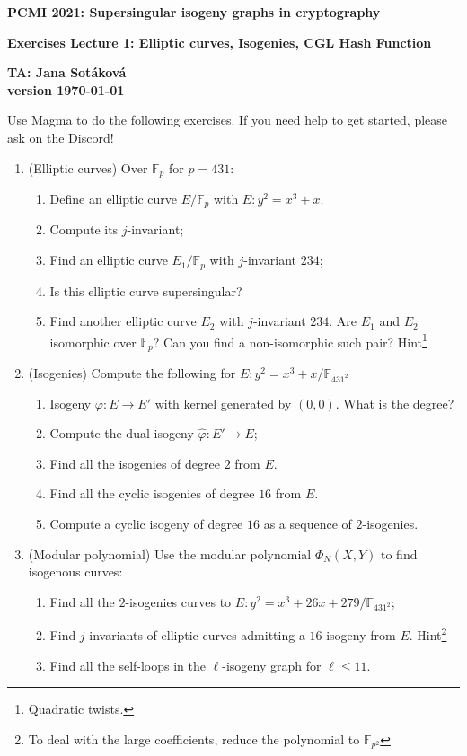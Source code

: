 \documentclass[12pt]{report}
\newcommand{\F}{\mathbb{F}}
\begin{document}
\thispagestyle{empty}

\sloppy
\centerline{\Large\bf PCMI 2021: Supersingular isogeny graphs in cryptography } 

\vspace{4mm}
\centerline{\Large\bf Exercises Lecture 1: Elliptic curves, Isogenies, CGL Hash Function} 
\vspace{4mm}
\centerline{\bf TA: Jana Sot\'{a}kov\'{a}  \\  version \today }

\smallskip

Use Magma to do the following exercises. If you need help to get started, please ask on the Discord!
\begin{enumerate}
\item (Elliptic curves) Over $\mathbb{F}_p$ for $p = 431$:
\begin{enumerate}
\item Define an elliptic curve $E/ \mathbb{F}_p$ with $E: y^2 = x^3 +x$.
\item Compute its $j$-invariant;
\item Find an elliptic curve $E_1 / \mathbb{F}_p$ with $j$-invariant $234$;
\item Is this elliptic curve supersingular?
\item Find another elliptic curve $E_2$ with $j$-invariant $234$. Are $E_1$ and $E_2$ isomorphic over $\F_p$? Can you find a non-isomorphic such pair? Hint\footnote{Quadratic twists.}
\end{enumerate}
\item (Isogenies) Compute the following for $E: y^2 = x^3 +x / \mathbb{F}_{431^2}$
\begin{enumerate}
\item Isogeny $ \varphi: E  \rightarrow E'$ with kernel generated by $(0,0)$. What is the degree?
\item Compute the dual isogeny $\hat{\varphi} : E' \rightarrow E$;
\item Find all the isogenies of degree $2$ from $E$.
\item Find all the cyclic isogenies of degree $16$ from $E$.
\item Compute a cyclic isogeny of degree $16$ as a sequence of $2$-isogenies.
\end{enumerate}
\item (Modular polynomial) Use the modular polynomial $\Phi_N(X,Y)$ to find isogenous curves:
\begin{enumerate}
\item Find all the $2$-isogenies curves to $E : y^2 = x^3 + 26x + 279/ \mathbb{F}_{431^2}$;
\item Find $j$-invariants of elliptic curves admitting a $16$-isogeny from $E$. Hint\footnote{To deal with the large coefficients, reduce the polynomial to $\mathbb{F}_{p^2}$}
\item Find all the self-loops in the $\ell$-isogeny graph for $\ell \leq 11$. 
\end{enumerate}


\end{enumerate}
\end{document}
